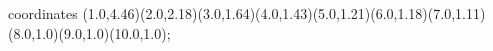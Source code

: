 					coordinates { (1.0,4.46)(2.0,2.18)(3.0,1.64)(4.0,1.43)(5.0,1.21)(6.0,1.18)(7.0,1.11)(8.0,1.0)(9.0,1.0)(10.0,1.0)};